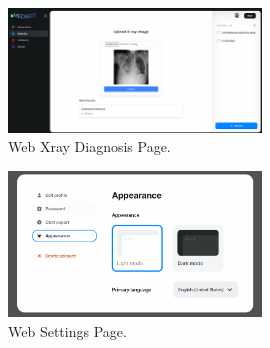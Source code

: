 \begin{figure}[H]
    \centering
    \includegraphics[width=0.6\textwidth]{./Figures/web-xray.png}
    \caption{Web Xray Diagnosis Page.}
    \label{fig:web-xray}
\end{figure}

\begin{figure}[H]
    \centering
    \includegraphics[width=0.6\textwidth]{./Figures/web-settings.png}
    \caption{Web Settings Page.}
    \label{fig:web-settings}
\end{figure}


